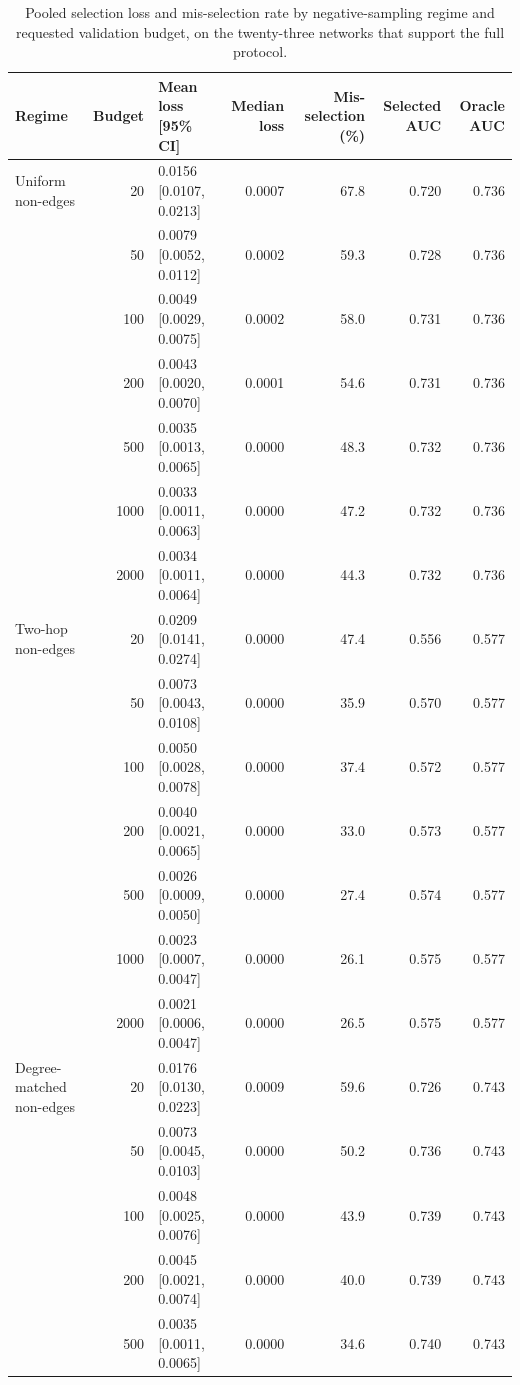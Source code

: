 \begin{table}[htbp]
\centering
\scriptsize
\setlength{\tabcolsep}{4pt}
\caption{Pooled selection loss and mis-selection rate by negative-sampling regime and requested validation budget, on the twenty-three networks that support the full protocol.}
\label{tab:pooled}
\begin{tabular}{l r l r r r r}
\toprule
Regime & Budget & Mean loss [95\% CI] & Median loss & Mis-selection (\%) & Selected AUC & Oracle AUC \\
\midrule
Uniform non-edges & 20 & 0.0156 [0.0107, 0.0213] & 0.0007 & 67.8 & 0.720 & 0.736 \\
 & 50 & 0.0079 [0.0052, 0.0112] & 0.0002 & 59.3 & 0.728 & 0.736 \\
 & 100 & 0.0049 [0.0029, 0.0075] & 0.0002 & 58.0 & 0.731 & 0.736 \\
 & 200 & 0.0043 [0.0020, 0.0070] & 0.0001 & 54.6 & 0.731 & 0.736 \\
 & 500 & 0.0035 [0.0013, 0.0065] & 0.0000 & 48.3 & 0.732 & 0.736 \\
 & 1000 & 0.0033 [0.0011, 0.0063] & 0.0000 & 47.2 & 0.732 & 0.736 \\
 & 2000 & 0.0034 [0.0011, 0.0064] & 0.0000 & 44.3 & 0.732 & 0.736 \\
\addlinespace[2pt]
Two-hop non-edges & 20 & 0.0209 [0.0141, 0.0274] & 0.0000 & 47.4 & 0.556 & 0.577 \\
 & 50 & 0.0073 [0.0043, 0.0108] & 0.0000 & 35.9 & 0.570 & 0.577 \\
 & 100 & 0.0050 [0.0028, 0.0078] & 0.0000 & 37.4 & 0.572 & 0.577 \\
 & 200 & 0.0040 [0.0021, 0.0065] & 0.0000 & 33.0 & 0.573 & 0.577 \\
 & 500 & 0.0026 [0.0009, 0.0050] & 0.0000 & 27.4 & 0.574 & 0.577 \\
 & 1000 & 0.0023 [0.0007, 0.0047] & 0.0000 & 26.1 & 0.575 & 0.577 \\
 & 2000 & 0.0021 [0.0006, 0.0047] & 0.0000 & 26.5 & 0.575 & 0.577 \\
\addlinespace[2pt]
Degree-matched non-edges & 20 & 0.0176 [0.0130, 0.0223] & 0.0009 & 59.6 & 0.726 & 0.743 \\
 & 50 & 0.0073 [0.0045, 0.0103] & 0.0000 & 50.2 & 0.736 & 0.743 \\
 & 100 & 0.0048 [0.0025, 0.0076] & 0.0000 & 43.9 & 0.739 & 0.743 \\
 & 200 & 0.0045 [0.0021, 0.0074] & 0.0000 & 40.0 & 0.739 & 0.743 \\
 & 500 & 0.0035 [0.0011, 0.0065] & 0.0000 & 34.6 & 0.740 & 0.743 \\

\end{tabular}
\end{table}
